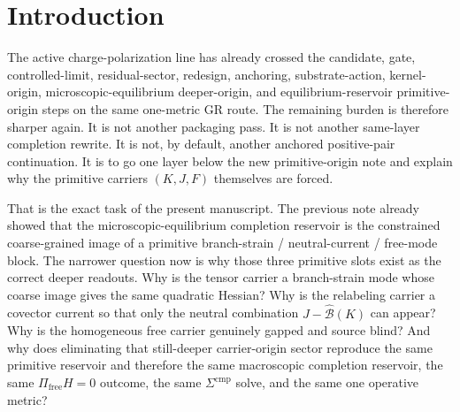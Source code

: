 \documentclass[11pt]{article}
\newcommand{\ObserverMetric}{g^{\mathrm{br}}}
\newcommand{\CompShift}{\Sigma^{\mathrm{cmp}}}
\newcommand{\CompLift}{\widehat\Sigma^{\mathrm{cmp}}}
\newcommand{\ResidualCore}{\mathcal V_{\mu\nu}^{\mathrm{res}}}
\newcommand{\ResidualLift}{\widehat{\mathcal V}^{\mathrm{res}}}
\newcommand{\SubGaugeVec}{\widehat{\mathcal B}}
\newcommand{\SubReducedEin}{\widehat{\mathcal L}}
\newcommand{\GaugeAux}{Y}
\newcommand{\ReducedEin}{\mathcal L_{\ObserverMetric}}
\newcommand{\MicFunctional}{\mathscr F_{\mathrm{mic}}}
\newcommand{\PrimStrain}{K}
\newcommand{\PrimNeutral}{J}
\newcommand{\PrimFree}{F}
\begin{document}
\begin{abstract}
Constrained elimination of the still-deeper carrier-origin sector at fixed coarse readouts \((\PrimStrain,\PrimNeutral,\PrimFree)\) reproduces exactly the primitive reservoir of the previous note. A second, previously recorded coarse-graining step at fixed \((H,\GaugeAux)\) then reproduces the same microscopic-equilibrium functional \(\MicFunctional[H,\GaugeAux]\). Consequently the same \(\Pi_{\mathrm{free}}H=0\) outcome, the same substrate solve
\[
\SubReducedEin(\CompLift)=-\ResidualLift,
\]
the same observer solve
\[
\ReducedEin(\CompShift)=-\ResidualCore,
\]
and the same one operative metric and recorded Phase D / E and Phase F gains follow once more.

The result remains disciplined. This note does not claim a final ultraviolet completion or a uniqueness theorem beyond the present local carrier-origin scope. Its positive claim is narrower and exact: the previously primitive branch-strain, neutral-current, and free-mode reservoir carriers are now recovered as the coarse image of a still-deeper carrier-origin sector while preserving the same one-metric GR claim boundary.
\end{abstract}

\section{Introduction}

The active charge-polarization line has already crossed the candidate, gate, controlled-limit, residual-sector, redesign, anchoring, substrate-action, kernel-origin, microscopic-equilibrium deeper-origin, and equilibrium-reservoir primitive-origin steps on the same one-metric GR route. The remaining burden is therefore sharper again. It is not another packaging pass. It is not another same-layer completion rewrite. It is not, by default, another anchored positive-pair continuation. It is to go one layer below the new primitive-origin note and explain why the primitive carriers \((\PrimStrain,\PrimNeutral,\PrimFree)\) themselves are forced.

That is the exact task of the present manuscript. The previous note already showed that the microscopic-equilibrium completion reservoir is the constrained coarse-grained image of a primitive branch-strain / neutral-current / free-mode block. The narrower question now is why those three primitive slots exist as the correct deeper readouts. Why is the tensor carrier a branch-strain mode whose coarse image gives the same quadratic Hessian? Why is the relabeling carrier a covector current so that only the neutral combination \(\PrimNeutral-\SubGaugeVec(\PrimStrain)\) can appear? Why is the homogeneous free carrier genuinely gapped and source blind? And why does eliminating that still-deeper carrier-origin sector reproduce the same primitive reservoir and therefore the same macroscopic completion reservoir, the same \(\Pi_{\mathrm{free}}H=0\) outcome, the same \(\Sigma^{\mathrm{cmp}}\) solve, and the same one operative metric?
\end{document}
